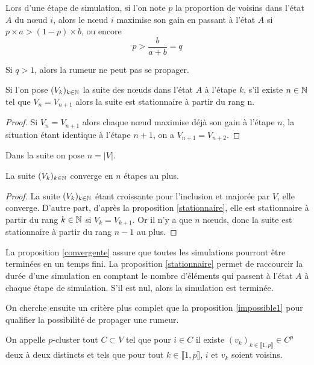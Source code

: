 \documentclass{article}
\begin{document}
Lors d'une étape de simulation, si l'on note $p$ la proportion de voisins dans l'état $A$ du nœud $i$, alors le nœud $i$ maximise son gain en passant à l'état $A$ si $p \times a > (1-p) \times b$, ou encore $$ p > \frac{b}{a+b} = q$$ 

\begin{prop}
  \label{impossible1}
  Si $q > 1$, alors la rumeur ne peut pas se propager.
\end{prop}

\begin{prop}
  \label{stationnaire}
  Si l'on pose $(V_k)_{k\in\mathbb{N}}$ la suite des nœuds dans l'état $A$ à l'étape $k$, s'il existe $n\in\mathbb{N}$ tel que $V_n = V_{n+1}$ alors la suite est stationnaire à partir du rang n.
\end{prop}
\begin{proof}
  Si $V_n = V_{n+1}$ alors chaque nœud maximise déjà son gain à l'étape $n$, la situation étant identique à l'étape $n+1$, on a $V_{n+1} = V_{n+2}$.
\end{proof}

Dans la suite on pose $n=|V|$.

\begin{prop}
  \label{convergente}
  La suite $(V_k)_{k\in\mathbb{N}}$ converge en $n$ étapes au plus.
\end{prop}
\begin{proof}
  La suite $(V_k)_{k\in\mathbb{N}}$ étant croissante pour l'inclusion et majorée par $V$, elle converge. D'autre part, d'après la proposition \ref{stationnaire}, elle est stationnaire à partir du rang $k\in\mathbb{N}$ si $V_k = V_{k+1}$. Or il n'y a que $n$ nœuds, donc la suite est stationnaire à partir du rang $n-1$ au plus. 
\end{proof}

La proposition \ref{convergente} assure que toutes les simulations pourront être terminées en un temps fini. La proposition \ref{stationnaire} permet de raccourcir la durée d'une simulation en comptant le nombre d'éléments qui passent à l'état $A$ à chaque étape de simulation. S'il est nul, alors la simulation est terminée.

On cherche ensuite un critère plus complet que la proposition \ref{impossible1} pour qualifier la possibilité de propager une rumeur.
\begin{defi}
  On appelle $p$-cluster tout $C \subset V$ tel que pour $i\in C$ il existe $(v_k)_{k\in \llbracket1,p\rrbracket} \in C^p$ deux à deux distincts et tels que pour tout $k\in \llbracket1,p\rrbracket$, $i$ et $v_k$ soient voisins.
\end{defi}
\end{document}
